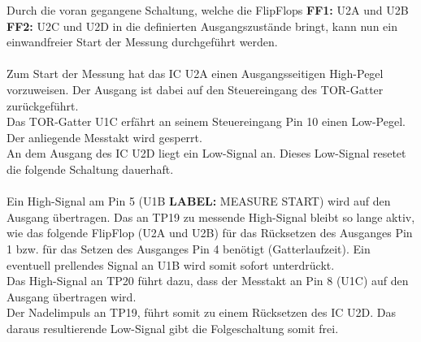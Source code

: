 \documentclass[a4paper,11pt]{scrartcl}
\begin{document}
Durch die voran gegangene Schaltung, welche die FlipFlops \textbf{FF1:} U2A und U2B \textbf{FF2:} U2C und U2D in die definierten Ausgangszustände bringt, kann nun ein einwandfreier Start der Messung durchgeführt werden. 
\\
\\
Zum Start der Messung hat das IC U2A einen Ausgangsseitigen High-Pegel vorzuweisen. Der Ausgang ist dabei auf den Steuereingang des TOR-Gatter zurückgeführt.
\\
Das TOR-Gatter U1C erfährt an seinem Steuereingang Pin 10 einen Low-Pegel. Der anliegende Messtakt wird gesperrt.
\\
An dem Ausgang des IC U2D liegt ein Low-Signal an. Dieses Low-Signal resetet die folgende Schaltung dauerhaft.  
\\
\\
Ein High-Signal am Pin 5 (U1B \textbf{LABEL:} MEASURE START) wird auf den Ausgang übertragen. Das an TP19 zu messende High-Signal bleibt so lange aktiv, wie das folgende FlipFlop (U2A und U2B) für das Rücksetzen des Ausganges Pin 1 bzw. für das Setzen des Ausganges Pin 4 benötigt (Gatterlaufzeit). Ein eventuell prellendes Signal an U1B wird somit sofort unterdrückt.
\\
Das High-Signal an TP20 führt dazu, dass der Messtakt an Pin 8 (U1C) auf den Ausgang übertragen wird. 
\\ 
Der Nadelimpuls an TP19, führt somit zu einem Rücksetzen des IC U2D. Das daraus resultierende Low-Signal gibt die Folgeschaltung somit frei. 
\end{document}
